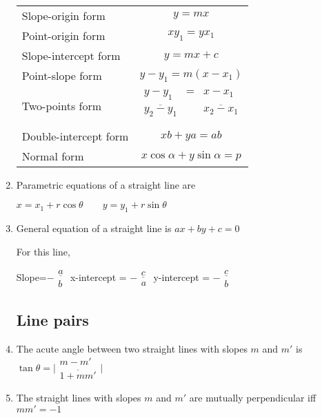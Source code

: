 \documentclass[a4paper]{article}
\begin{document}
\begin{enumerate}
\begin{tabular}{lc}
Slope-origin form & $y=mx$ \\
Point-origin form & $xy_1 = yx_1$ \\
Slope-intercept form & $y=mx+c$ \\
Point-slope form & $y-y_1 = m(x-x_1)$ \\
Two-points form & $
\begin{array}{ccc}
y-y_1 & = & x-x_1 \\
\overline{y_2-y_1} & &  \overline{x_2-x_1} \\
\end{array}
$ \\
Double-intercept form & $xb + ya = ab$ \\
Normal form & $x\cos\alpha + y\sin\alpha = p$ \\
\end{tabular}

\item
Parametric equations of a straight line are

$x=x_1 + r\cos\theta
\qquad
y=y_1 + r\sin\theta$

\item
General equation of a straight line is $ax+by+c=0$

For this line, 

Slope=$-\begin{array}{c}\underline{a} \\ b\end{array}$
\qquad
x-intercept = $-\begin{array}{c}\underline{c} \\ a\end{array}$
\qquad
y-intercept = $-\begin{array}{c}\underline{c} \\ b\end{array}$

\subsection{Line pairs}

\item
The acute angle between
two straight lines with slopes $m$ and $m'$
is $\tan \theta=\Big|
\begin{array}{c}
m-m' \\
\overline{1+mm'}
\end{array}\Big|$

\item
The straight lines with slopes $m$ and $m'$
are mutually perpendicular iff $mm'=-1$


\end{enumerate}
\end{document}

